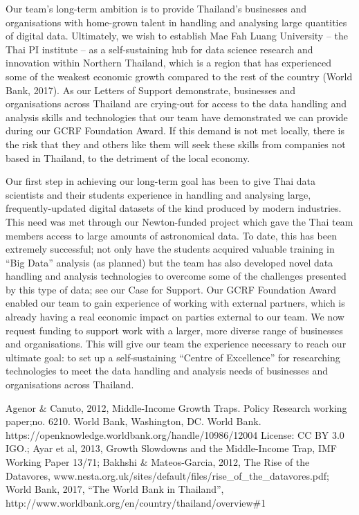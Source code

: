 \documentclass[11pt]{article}
\begin{document}
  \vspace{2mm}
  \noindent
  Our team's long-term ambition is to provide Thailand's businesses and organisations with home-grown talent in handling and analysing large quantities of digital data. Ultimately, we wish to establish Mae Fah Luang University -- the Thai PI institute -- as a self-sustaining hub for data science research and innovation within Northern Thailand, which is a region that has experienced some of the weakest economic growth compared to the rest of the country (World Bank, 2017). As our Letters of Support demonstrate, businesses and organisations across Thailand are crying-out for access to the data handling and analysis skills and technologies that our team have demonstrated we can provide during our GCRF Foundation Award. If this demand is not met locally, there is the risk that they and others like them will seek these skills from companies not based in Thailand, to the detriment of the local economy.
  
  \vspace{2mm}
  \noindent
  Our first step in achieving our long-term goal has been to give Thai data scientists and their students experience in handling and analysing large, frequently-updated digital datasets of the kind produced by modern industries. This need was met through our Newton-funded project which gave the Thai team members access to large amounts of astronomical data. To date, this has been extremely successful; not only have the students acquired valuable training in ``Big Data'' analysis (as planned) but the team has also developed novel data handling and analysis technologies to overcome some of the challenges presented by this type of data; see our Case for Support. Our GCRF Foundation Award enabled our team to gain experience of working with external partners, which is already having a real economic impact on parties external to our team. We now request funding to support work with a larger, more diverse range of businesses and organisations. This will give our team the experience necessary to reach our ultimate goal: to set up a self-sustaining ``Centre of Excellence'' for researching technologies to meet the data handling and analysis needs of businesses and organisations across Thailand.
  
  \vspace{2mm}
   {\scriptsize Agenor \& Canuto, 2012, Middle-Income Growth Traps. Policy Research working paper;no. 6210. World Bank, Washington, DC. World Bank. https://openknowledge.worldbank.org/handle/10986/12004 License: CC BY 3.0 IGO.; Ayar et al, 2013, Growth Slowdowns and the Middle-Income Trap, IMF Working Paper 13/71; Bakhshi \& Mateos-Garcia, 2012, The Rise of the Datavores, www.nesta.org.uk/sites/default/files/rise\_of\_the\_datavores.pdf; World Bank, 2017, ``The World Bank in Thailand'', http://www.worldbank.org/en/country/thailand/overview\#1}
    
  
\end{document}
